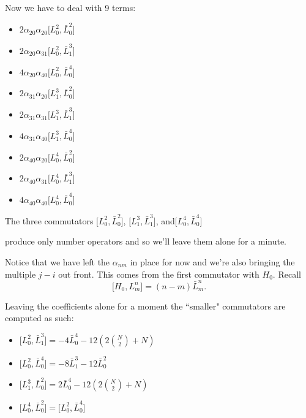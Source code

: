 \documentclass{article}
\newcommand{\lrbrack}[2]{\lbrack #1 , #2 \rbrack}
\begin{document}
Now we have to deal with 9 terms:
\begin{itemize}
\item $2\alpha_{20}\alpha_{20} \lrbrack{L_0^2}{\bar{L}_0^2}$\\
\item $2\alpha_{20}\alpha_{31}\lrbrack{L_0^2}{\bar{L}_1^3}$\\
\item $4\alpha_{20}\alpha_{40}\lrbrack{L_0^2}{\bar{L}_0^4}$\\
\item $2\alpha_{31}\alpha_{20}\lrbrack{L_1^3}{\bar{L}_0^2}$\\
\item $2\alpha_{31}\alpha_{31}\lrbrack{L_1^3}{\bar{L}_1^3}$\\
\item $4\alpha_{31}\alpha_{40}\lrbrack{L_1^3}{\bar{L}_0^4}$\\
\item $2\alpha_{40}\alpha_{20}\lrbrack{L_0^4}{\bar{L}_0^2}$\\
\item $2\alpha_{40}\alpha_{31}\lrbrack{L_0^4}{\bar{L}_1^3}$\\
\item $4\alpha_{40}\alpha_{40}\lrbrack{L_0^4}{\bar{L}_0^4}$\\
\end{itemize}

The three commutators $\lrbrack{L_0^2}{\bar{L}_0^2}$, $\lrbrack{L_1^3}{\bar{L}_1^3}$, and$\lrbrack{L_0^4}{\bar{L}_0^4}$

produce only number operators and so we'll leave them alone for a minute.

Notice that we have left the $\alpha_{nm}$ in place for now and we're also bringing the multiple $j-i$ out front.  This comes from the first commutator with $H_0$.  Recall
\[
\lrbrack{H_0}{L_m^n} = (n-m) \bar{L}_m^n.
\]

Leaving the coefficients alone for a moment the ``smaller" commutators are computed as such:

\begin{itemize}
\item $\lrbrack{L_0^2}{\bar{L}_1^3} = -4 \bar{L}_0^4 - 12(2{N \choose 2} + N)$\\
\item $\lrbrack{L_0^2}{\bar{L}_0^4} = -8\bar{L}_1^3 - 12 \bar{L}_0^2$\\
\item $\lrbrack{L_1^3}{\bar{L}_0^2} = 2\bar{L}_0^4 - 12(2{N \choose 2} +N)$\\
\item $\lrbrack{L_0^4}{\bar{L}_0^2} = \lrbrack{L_0^2}{\bar{L}_0^4} $
\end{itemize}
\end{document}
